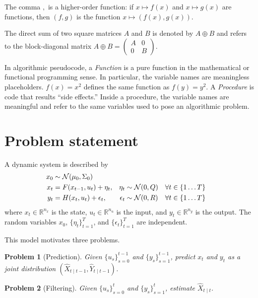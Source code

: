 \documentclass{article} %
\newtheorem{problem}{Problem}
\begin{document}
The comma \(,\) is a higher-order function:
if \(x \mapsto f(x)\) and \(x \mapsto g(x)\) are functions, then \((f
, g)\) is the function \(x \mapsto (f(x), g(x))\).

The direct sum of two square matrices \(A\) and \(B\) is denoted by
\(A \oplus B\) and refers to the block-diagonal matrix \(A \oplus B =
  \begin{pmatrix} A & 0 \\ 0 & B
\end{pmatrix}\).

In algorithmic pseudocode, a \emph{Function} is a pure function in
the mathematical or functional
programming sense.
In particular, the variable names are meaningless placeholders.
\(f(x) = x^2\) defines the same function as \(f(y) = y^2\).
A \emph{Procedure} is code that results ``side effects.''
Inside a procedure, the variable names are meaningful and refer to
the same variables used to pose an algorithmic problem.



\section{Problem statement}
A dynamic system is described by
\begin{subequations}
  \label{eq:dynamic-system}
  \begin{align}
    x_0 &\sim \mathcal{N}(\mu_0, \Sigma_0) \\
    x_t &= F(x_{t-1}, u_t) + \eta_t, &\eta_t &\sim \mathcal{N}(0, Q)
    & \forall t &\in \cbr{1 \ldots T}\\
    y_t &= H(x_t, u_t) + \epsilon_t, &\epsilon_t &\sim \mathcal{N}(0,
    R) & \forall t &\in \cbr{1 \ldots T}
  \end{align}
\end{subequations}
where \(x_t \in \mathbb{R}^{n_x}\) is the state, \(u_t \in \mathbb
R^{n_u}\) is the input, and \(y_t \in \mathbb{R}^{n_y}\) is the output.
The random variables \(x_0\), \(\{\eta_t\}_{t=1}^T\), and
\(\{\epsilon_t\}_{t=1}^T\) are independent.

This model motivates three problems.
\begin{problem}[Prediction]\label{problem:prediction}
  Given \(\{u_s\}_{s=0}^{t-1}\) and \(\{y_s\}_{s=1}^{t-1}\), predict
  \(x_t\) and \(y_t\) as a joint distribution \((\hat X_{t \mid t-1},
  \hat Y_{t \mid t-1})\).
\end{problem}

\begin{problem}[Filtering]\label{problem:filtering}
  Given \(\{u_s\}_{s=0}^{t}\) and \(\{y_s\}_{s=1}^t\), estimate
  \(\hat X_{t \mid t}\).
\end{problem}
\end{document}
